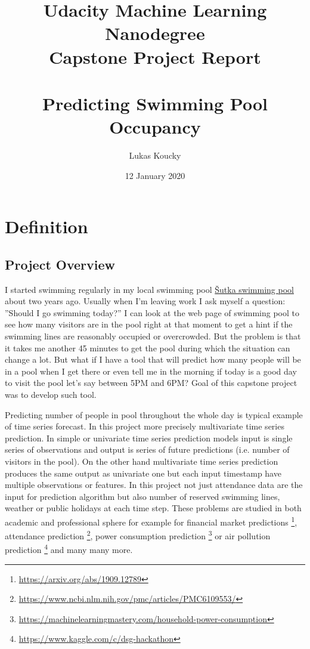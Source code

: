 \documentclass{article}
\title{Udacity Machine Learning Nanodegree\\
       Capstone Project Report \\
        \ \\
        Predicting Swimming Pool Occupancy}
\author{Lukas Koucky}
\date{12 January 2020}
\begin{document}
\maketitle

\section{Definition}
\subsection{Project Overview}
I started swimming regularly in my local swimming pool \href{https://www.sutka.eu/en/}{\v{S}utka swimming pool} about two years ago. Usually when I’m leaving work I ask myself a question: ''Should I go swimming today?'' I can look at the web page of swimming pool to see how many visitors are in the pool right at that moment to get a hint if the swimming lines are reasonably occupied or overcrowded. But the problem is that it takes me another 45 minutes to get the pool during which the situation can change a lot. But what if I have a tool that will predict how many people will be in a pool when I get there or even tell me in the morning if today is a good day to visit the pool let’s say between 5PM and 6PM? Goal of this capstone project was to develop such tool. \par

Predicting number of people in pool throughout the whole day is typical example of time series forecast. In this project more precisely multivariate time series prediction. In simple or univariate time series prediction models input is single series of observations and output is series of future predictions (i.e. number of visitors in the pool). On the other hand multivariate time series prediction produces the same output as univariate one but each input timestamp have multiple observations or features. In this project not just attendance data are the input for prediction algorithm but also number of reserved swimming lines, weather or public holidays at each time step. These problems are studied in both academic and professional sphere for example for financial market predictions \footnote{\url{https://arxiv.org/abs/1909.12789}}, attendance prediction \footnote{\url{https://www.ncbi.nlm.nih.gov/pmc/articles/PMC6109553/}}, power consumption prediction \footnote{\href{https://machinelearningmastery.com/how-to-develop-lstm-models-for-multi-step-time-series-forecasting-of-household-power-consumption/}{https://machinelearningmastery.com/household-power-consumption}} or air pollution prediction \footnote{\url{https://www.kaggle.com/c/dsg-hackathon}} and many many more.\par
\end{document}
